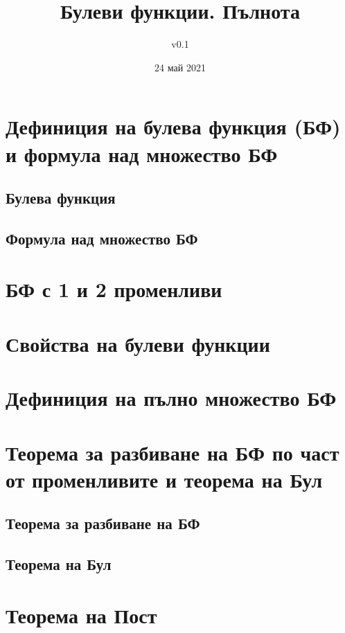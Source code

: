 \documentclass[fleqn,12pt]{article}
\title{Булеви функции. Пълнота}
\author{v0.1}
\date{24 май 2021}
\begin{document}
\maketitle

\tableofcontents

\begin{flushleft}

\section{Дефиниция на булева функция (БФ) и формула над множество БФ}

\subsection{Булева функция}

\subsection{Формула над множество БФ}

\section{БФ с 1 и 2 променливи}

\section{Свойства на булеви функции}

\section{Дефиниция на пълно множество БФ}

\section{Теорема за разбиване на БФ по част от променливите и теорема на Бул}

\subsection{Теорема за разбиване на БФ}

\subsection{Теорема на Бул}

\section{Теорема на Пост}


\end{flushleft}
\end{document}
